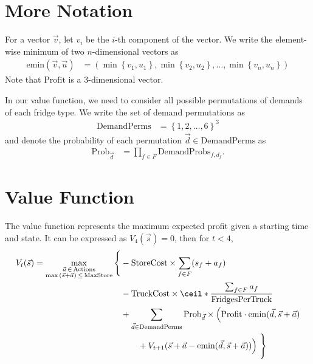 \documentclass[11pt,a4paper]{article}
\begin{document}
\section{More Notation}
For a vector $\vec v$, let $v_i$ be the $i$-th component of the vector.
We write the element-wise minimum of two $n$-dimensional vectors as 
\begin{align*}
     \mathrm{emin}( \vec v, \vec u ) &= \left( \min \left\{ v_1, u_1 \right\}, \min \left\{ v_2, u_2 \right\}, \ldots, \min \left\{ v_n, u_n \right\} \right)
\end{align*}
Note that $\mathrm{Profit}$ is a 3-dimensional vector. 

In our value function, we need to consider all possible permutations of demands 
of each fridge type. We write the set of demand permutations as  
\begin{align*}
    \mathrm{DemandPerms} &= \left\{ 1, 2, \ldots, 6\right\}^3
\end{align*}
and denote the probability of each permutation $\vec d \in \mathrm{DemandPerms}$ 
as 
\begin{align*}
    \mathrm{Prob}_\vec d &= \prod_{f \in F} \mathrm{DemandProbs}_{f, d_f}.
\end{align*}

\section{Value Function}
The value function represents the maximum expected profit given a starting time 
and state. It can be expressed as $V_4(\vec s) = 0$, then for $t < 4$,
\begin{align*}
    V_{t}(\vec s) = 
    \max_{ \substack{\vec a \,\in\, \mathrm{Actions} \\ \max \,(\vec s + \vec a)\, \le\, \mathrm{MaxStore} } }\Bigg\{& 
        -\mathrm{StoreCost}\times\sum_{f \in F} (s_f + a_f) \\ 
        &-\mathrm{TruckCost}\times \ceil*{\frac{\sum_{f\in F} a_f}{\mathrm{FridgesPerTruck}}} \\ 
        & + \sum_{\vec d \in \mathrm{DemandPerms}} \mathrm{Prob}_{\vec d} \times \Big( \mathrm{Profit} \cdot \mathrm{emin} ( \vec d, \vec s + \vec a)   \\ 
        & \qquad + V_{t+1} (\vec s + \vec a - \mathrm{emin} (\vec d, \vec s + \vec a) )\Big) \,\,\Bigg\}
\end{align*}
\end{document}
